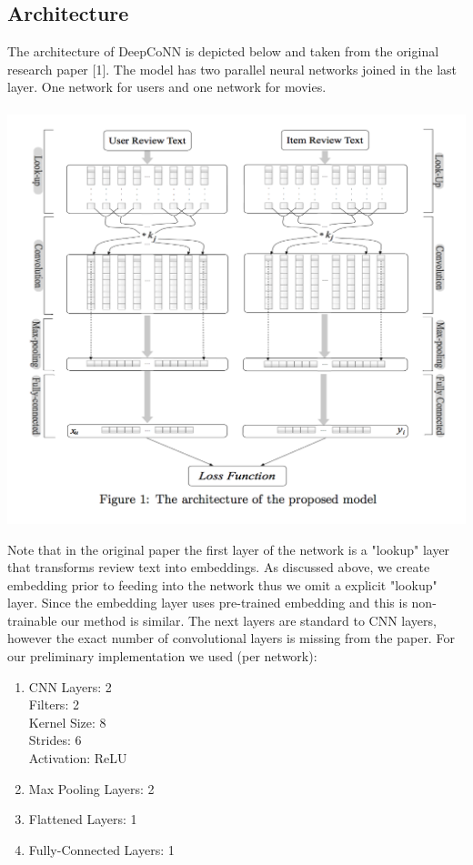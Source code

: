 \documentclass[10pt,twocolumn,letterpaper]{article}
\begin{document}
\subsection{Architecture}
The architecture of DeepCoNN is depicted below and taken from the original research paper [1]. The model has two parallel neural networks joined in the last layer. One network for
users and one network for movies.\\
\ \newline
\includegraphics[scale=0.38]{DeepCoNN}

Note that in the original paper the first layer of the network is a "lookup" layer that transforms review text into embeddings. As discussed above, we create embedding prior to feeding into the network thus we omit a explicit "lookup" layer. Since the embedding layer uses pre-trained embedding and this is non-trainable our method is similar. The next layers are standard to CNN layers, however the exact number of convolutional layers is missing from the paper. For our preliminary implementation we used (per network): \\

\begin{enumerate}
\item CNN Layers: 2 \\
    \hspace*{5mm} Filters: 2 \\
    \hspace*{5mm} Kernel Size: 8 \\
    \hspace*{5mm} Strides: 6 \\
    \hspace*{5mm} Activation: ReLU 
\item Max Pooling Layers: 2
\item Flattened Layers: 1
\item Fully-Connected Layers: 1
\end{enumerate}
\end{document}
